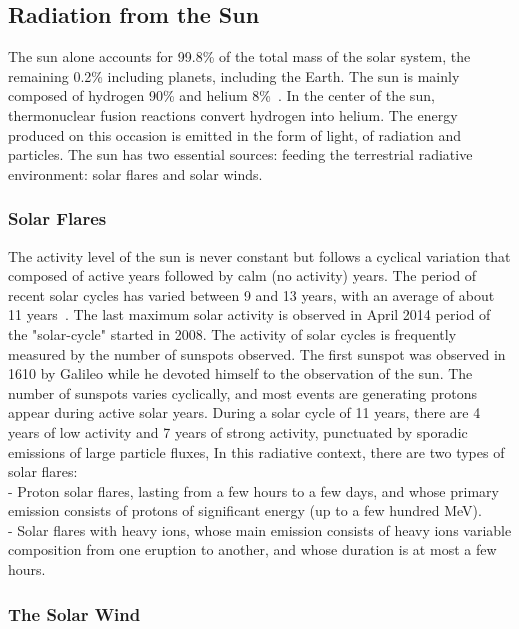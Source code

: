 \subsection{Radiation from the Sun} 

The sun alone accounts for 99.8\% of the total mass of the solar system, the remaining 0.2\% including planets, including the Earth. The sun is mainly composed of hydrogen 90\% and helium 8\%~\cite{wikisun}. In the center of the sun, thermonuclear fusion reactions convert hydrogen into helium. The energy produced on this occasion is emitted in the form of light,
of radiation and particles. The sun has two essential sources: feeding the terrestrial radiative environment: solar flares and solar winds. 

\subsubsection{Solar Flares} 

The activity level of the sun is never constant but follows a cyclical variation that composed of active years followed by calm (no activity) years. The period of recent solar cycles has
varied between 9 and 13 years, with an average of about 11 years~\cite{nasa}. The last maximum solar activity is observed in April 2014 period of the "solar-cycle" started in 2008. The activity of solar cycles is frequently measured by the number of sunspots observed. The first sunspot was observed in 1610 by Galileo while he devoted himself to the observation of the sun. The number of sunspots varies cyclically, and most events are
generating protons appear during active solar years. During a solar cycle of 11 years, there are 4 years of low activity and 7 years of strong activity, punctuated by sporadic emissions of large particle fluxes, In this radiative context, there are two types of solar flares: \\
- Proton solar flares, lasting from a few hours to a few days, and
whose primary emission consists of protons of significant energy (up to
a few hundred MeV). \\
- Solar flares with heavy ions, whose main emission consists of heavy ions variable composition from one eruption to another, and whose duration is at most a few
hours. 

\subsubsection{The Solar Wind}

